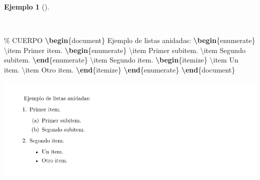 \documentclass[
  a4paper,
]{scrreport}
\newenvironment{Shaded}{\begin{snugshade}}{\end{snugshade}}
\newcommand{\CommentTok}[1]{\textcolor[rgb]{0.37,0.37,0.37}{#1}}
\newcommand{\ExtensionTok}[1]{\textcolor[rgb]{0.00,0.23,0.31}{#1}}
\newcommand{\FunctionTok}[1]{\textcolor[rgb]{0.28,0.35,0.67}{#1}}
\newcommand{\KeywordTok}[1]{\textcolor[rgb]{0.00,0.23,0.31}{\textbf{#1}}}
\newcommand{\NormalTok}[1]{\textcolor[rgb]{0.00,0.23,0.31}{#1}}
\theoremstyle{definition}
\newtheorem{example}{Ejemplo}[chapter]
\theoremstyle{remark}
\begin{document}
\begin{example}[]\protect\hypertarget{exm-listas-anidadas}{}\label{exm-listas-anidadas}

~

\begin{Shaded}
\begin{Highlighting}[]
\CommentTok{\% CUERPO}
\KeywordTok{\textbackslash{}begin}\NormalTok{\{}\ExtensionTok{document}\NormalTok{\}}
\NormalTok{Ejemplo de listas anidadas:}
\KeywordTok{\textbackslash{}begin}\NormalTok{\{}\ExtensionTok{enumerate}\NormalTok{\}}
\FunctionTok{\textbackslash{}item}\NormalTok{ Primer item.}
    \KeywordTok{\textbackslash{}begin}\NormalTok{\{}\ExtensionTok{enumerate}\NormalTok{\}}
    \FunctionTok{\textbackslash{}item}\NormalTok{ Primer subitem.}
    \FunctionTok{\textbackslash{}item}\NormalTok{ Segundo subitem.}
    \KeywordTok{\textbackslash{}end}\NormalTok{\{}\ExtensionTok{enumerate}\NormalTok{\}}
\FunctionTok{\textbackslash{}item}\NormalTok{ Segundo item.}
    \KeywordTok{\textbackslash{}begin}\NormalTok{\{}\ExtensionTok{itemize}\NormalTok{\}}
    \FunctionTok{\textbackslash{}item}\NormalTok{ Un item.}
    \FunctionTok{\textbackslash{}item}\NormalTok{ Otro item.}
    \KeywordTok{\textbackslash{}end}\NormalTok{\{}\ExtensionTok{itemize}\NormalTok{\}}
\KeywordTok{\textbackslash{}end}\NormalTok{\{}\ExtensionTok{enumerate}\NormalTok{\}}
\KeywordTok{\textbackslash{}end}\NormalTok{\{}\ExtensionTok{document}\NormalTok{\}}
\end{Highlighting}
\end{Shaded}

\begin{tcolorbox}[enhanced jigsaw, colframe=quarto-callout-note-color-frame, opacityback=0, title={Salida}, bottomrule=.15mm, left=2mm, coltitle=black, arc=.35mm, leftrule=.75mm, colback=white, rightrule=.15mm, colbacktitle=quarto-callout-note-color!10!white, toprule=.15mm, breakable, opacitybacktitle=0.6, bottomtitle=1mm, toptitle=1mm, titlerule=0mm]

\includegraphics{img/listas/listas-anidadas.png}

\end{tcolorbox}

\end{example}
\end{document}

